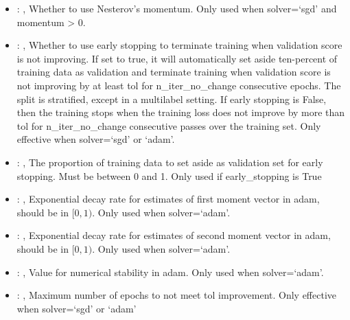 \begin{itemize}
    \item {}: , 
      Whether to use Nesterov's momentum. Only used when solver=`sgd' and momentum > 0.

    \item {}: , 
      Whether to use early stopping to terminate training when validation score is not improving.
      If set to true, it will automatically set aside ten-percent of training data as validation and
      terminate                                                  training when validation score is
      not improving by at least tol for n\_iter\_no\_change consecutive
      epochs. The split is stratified, except in a multilabel setting. If early stopping is False,
      then                                                  the training stops when the training
      loss does not improve by more than tol for n\_iter\_no\_change
      consecutive passes over the training set. Only effective when solver=`sgd' or `adam'.

    \item {}: , 
      The proportion of training data to set aside as validation set for early stopping. Must be
      between 0 and 1.                                                  Only used if early\_stopping
      is True

    \item {}: , 
      Exponential decay rate for estimates of first moment vector in adam, should be in $[0, 1)$.
      Only used when solver=`adam'.

    \item {}: , 
      Exponential decay rate for estimates of second moment vector in adam, should be in $[0, 1)$.
      Only used when solver=`adam'.

    \item {}: , 
      Value for numerical stability in adam. Only used when solver=`adam'.

    \item {}: , 
      Maximum number of epochs to not meet tol improvement. Only effective when
      solver=`sgd' or `adam'
  \end{itemize}


